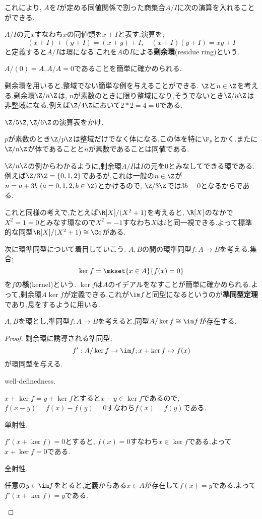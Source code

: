これにより, $A$を$I$が定める同値関係で割った商集合$A/I$に次の演算を入れることができる.

\begin{defi}[剰余環]
	$A/I$の元$\bar{x}$すなわち$x$の同値類を$x+I$と表す.演算を;
	\[(x+I)+(y+I)=(x+y)+I,\quad (x+I)(y+I)=xy+I\]
	と定義すると$A/I$は環になる.これを$A$の$I$による\textbf{剰余環}(residue ring)という.
\end{defi}

$A/(0)=A, A/A=0$であることを簡単に確かめられる.

剰余環を用いると,整域でない簡単な例を与えることができる. $\Z$と$n\in\Z$を考える.剰余環$\Z/n\Z$は, $n$が素数のときに限り整域になり,そうでないとき$\Z/n\Z$は非整域になる.例えば$\Z/4\Z$において$2*2=4=0$である.

\begin{exer}
	$\Z/5\Z,\Z/6\Z$の演算表をかけ.
\end{exer}

$p$が素数のとき$\Z/p\Z$は整域だけでなく体になる.この体を特に$\F_p$とかく.またに$\Z/n\Z$が体であることと$n$が素数であることは同値である.

$\Z/n\Z$の例からわかるように,剰余環$A/I$は$I$の元を0とみなしてできる環である.例えば$\Z/3\Z=\{0,1,2\}$であるが,これは一般の$n\in\Z$が$n=a+3b~(a=0,1,2, b\in\Z)$とかけるので, $\Z/3\Z$では$3b=0$となるからである.

これと同様の考えで,たとえば$\R[X]/(X^2+1)$を考えると, $\R[X]$のなかで$X^2=1=0$とみなす環なので$X^2=-1$すなわち$X$は$i$と同一視できる.よって標準的な同型$\R[X]/(X^2+1)\cong\Co$がある.

次に環準同型について着目していこう. $A,B$の間の環準同型$f:A\to B$を考える.集合;
\[\ker f=\mkset{x\in A}{f(x)=0}\]
を$f$の\textbf{核}(kernel)という. $\ker f$は$A$のイデアルをなすことが簡単に確かめられる.よって,剰余環$A\ker f$が定義できる.これが$\im f$と同型になるというのが\textbf{準同型定理}であり,息をするように用いる.

\begin{thm}[準同型定理]
	$A,B$を環とし,準同型$f:A\to B$を考えると,同型$A/\ker f\cong\im f$が存在する.
\end{thm}

\begin{proof}
	剰余環に誘導される準同型;
	\[f':A/\ker f\to\im f;x+\ker f\mapsto f(x)\]
	が環同型を与える.
	\begin{step}
		\item well-definedness.
		
		$x+\ker f=y+\ker f$とすると$x-y\in\ker f$であるので, $f(x-y)=f(x)-f(y)=0$すなわち$f(x)=f(y)$である.
		
		\item 単射性.
		
		$f'(x+\ker f)=0$とすると, $f(x)=0$すなわち$x\in\ker f$である.よって$x+\ker f=0$である.
		
		\item 全射性.
		
		任意の$y\in \im f$をとると,定義からある$x\in A$が存在して$f(x)=y$である.よって$f'(x+\ker f)=y$である.
	\end{step}
\end{proof}

